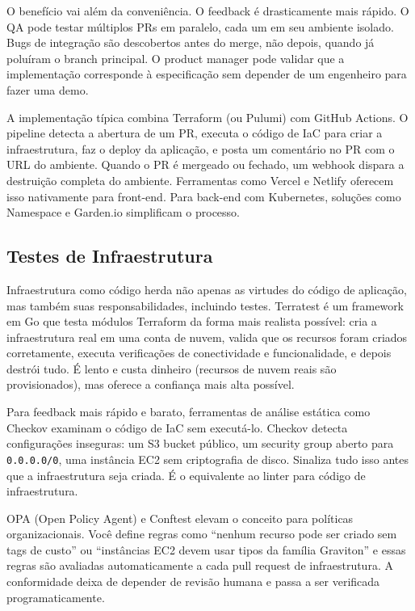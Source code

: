 O benefício vai além da conveniência. O feedback é drasticamente mais rápido.
O QA pode testar múltiplos PRs em paralelo, cada um em seu ambiente isolado.
Bugs de integração são descobertos antes do merge, não depois, quando já
poluíram o branch principal. O product manager pode validar que a implementação
corresponde à especificação sem depender de um engenheiro para fazer uma demo.

A implementação típica combina Terraform (ou Pulumi) com GitHub Actions. O
pipeline detecta a abertura de um PR, executa o código de IaC para criar a
infraestrutura, faz o deploy da aplicação, e posta um comentário no PR com o
URL do ambiente. Quando o PR é mergeado ou fechado, um webhook dispara a
destruição completa do ambiente. Ferramentas como Vercel e Netlify oferecem
isso nativamente para front-end. Para back-end com Kubernetes, soluções como
Namespace e Garden.io simplificam o processo.

\subsection{Testes de Infraestrutura}

Infraestrutura como código herda não apenas as virtudes do código de aplicação,
mas também suas responsabilidades, incluindo testes. Terratest é um framework
em Go que testa módulos Terraform da forma mais realista possível: cria a
infraestrutura real em uma conta de nuvem, valida que os recursos foram criados
corretamente, executa verificações de conectividade e funcionalidade, e depois
destrói tudo. É lento e custa dinheiro (recursos de nuvem reais são
provisionados), mas oferece a confiança mais alta possível.

Para feedback mais rápido e barato, ferramentas de análise estática como Checkov
examinam o código de IaC sem executá-lo. Checkov detecta configurações inseguras:
um S3 bucket público, um security group aberto para \texttt{0.0.0.0/0}, uma
instância EC2 sem criptografia de disco. Sinaliza tudo isso antes que a infraestrutura
seja criada. É o equivalente ao linter para código de infraestrutura.

OPA (Open Policy Agent) e Conftest elevam o conceito para políticas organizacionais.
Você define regras como ``nenhum recurso pode ser criado sem tags de custo'' ou
``instâncias EC2 devem usar tipos da família Graviton'' e essas regras são
avaliadas automaticamente a cada pull request de infraestrutura. A conformidade
deixa de depender de revisão humana e passa a ser verificada programaticamente.

